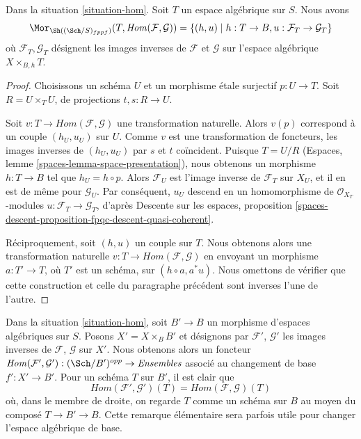 \begin{lemma}
\label{lemma-extend-hom-to-spaces}
Dans la situation \ref{situation-hom}. Soit $T$ un espace algébrique sur $S$.
Nous avons
$$
\Mor_{\Sh((\Sch/S)_{fppf})}(T, \mathit{Hom}(\mathcal{F}, \mathcal{G})) =
\{(h, u) \mid h : T \to B, u : \mathcal{F}_T \to \mathcal{G}_T\}
$$
où $\mathcal{F}_T, \mathcal{G}_T$ désignent les images inverses de
$\mathcal{F}$ et $\mathcal{G}$ sur l'espace algébrique
$X \times_{B, h} T$.
\end{lemma}

\begin{proof}
Choisissons un schéma $U$ et un morphisme \'etale surjectif $p : U \to T$.
Soit $R = U \times_T U$, de projections $t, s : R \to U$.

\medskip\noindent
Soit $v : T \to \mathit{Hom}(\mathcal{F}, \mathcal{G})$ une transformation
naturelle. Alors $v(p)$ correspond à un couple $(h_U, u_U)$ sur $U$. Comme
$v$ est une transformation de foncteurs, les images inverses de
$(h_U, u_U)$ par $s$ et $t$ coïncident. Puisque $T = U/R$ (Espaces, lemme
\ref{spaces-lemma-space-presentation}), nous obtenons un morphisme
$h : T \to B$ tel que $h_U = h \circ p$. Alors $\mathcal{F}_U$ est l'image
inverse de $\mathcal{F}_T$ sur $X_U$, et il en est de même pour
$\mathcal{G}_U$. Par conséquent, $u_U$ descend en un homomorphisme de
$\mathcal{O}_{X_T}$-modules $u : \mathcal{F}_T \to \mathcal{G}_T$, d'après
Descente sur les espaces, proposition
\ref{spaces-descent-proposition-fpqc-descent-quasi-coherent}.

\medskip\noindent
Réciproquement, soit $(h, u)$ un couple sur $T$. Nous obtenons alors une
transformation naturelle $v : T \to \mathit{Hom}(\mathcal{F}, \mathcal{G})$
en envoyant un morphisme $a : T' \to T$, où $T'$ est un schéma, sur
$(h \circ a, a^*u)$. Nous omettons de vérifier que cette construction et celle
du paragraphe précédent sont inverses l'une de l'autre.
\end{proof}

\begin{remark}
\label{remark-hom-base-change}
Dans la situation \ref{situation-hom}, soit $B' \to B$ un morphisme d'espaces
algébriques sur $S$. Posons $X' = X \times_B B'$ et désignons par
$\mathcal{F}'$, $\mathcal{G}'$ les images inverses de $\mathcal{F}$,
$\mathcal{G}$ sur $X'$. Nous obtenons alors un foncteur
$\mathit{Hom}(\mathcal{F}', \mathcal{G}') : (\Sch/B')^{opp} \to \textit{Ensembles}$
associé au changement de base $f' : X' \to B'$. Pour un schéma $T$ sur $B'$,
il est clair que
$$
\mathit{Hom}(\mathcal{F}', \mathcal{G}')(T) =
\mathit{Hom}(\mathcal{F}, \mathcal{G})(T)
$$
où, dans le membre de droite, on regarde $T$ comme un schéma sur $B$ au moyen
du composé $T \to B' \to B$. Cette remarque élémentaire sera parfois utile
pour changer l'espace algébrique de base.
\end{remark}

